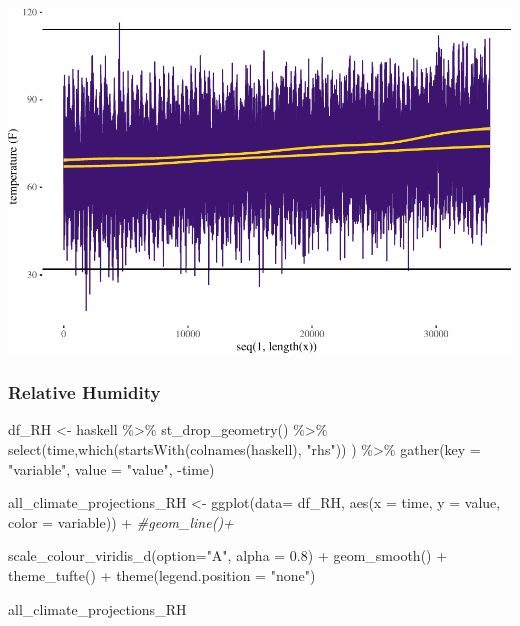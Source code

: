 \documentclass[
  paper=a4,
  ,captions=tableheading
]{scrartcl}
\newenvironment{Shaded}{\begin{snugshade}}{\end{snugshade}}
\newcommand{\AttributeTok}[1]{\textcolor[rgb]{0.77,0.63,0.00}{#1}}
\newcommand{\CommentTok}[1]{\textcolor[rgb]{0.56,0.35,0.01}{\textit{#1}}}
\newcommand{\FloatTok}[1]{\textcolor[rgb]{0.00,0.00,0.81}{#1}}
\newcommand{\FunctionTok}[1]{\textcolor[rgb]{0.00,0.00,0.00}{#1}}
\newcommand{\NormalTok}[1]{#1}
\newcommand{\OtherTok}[1]{\textcolor[rgb]{0.56,0.35,0.01}{#1}}
\newcommand{\SpecialCharTok}[1]{\textcolor[rgb]{0.00,0.00,0.00}{#1}}
\newcommand{\StringTok}[1]{\textcolor[rgb]{0.31,0.60,0.02}{#1}}
\begin{document}
\includegraphics{Haskell_files/figure-latex/unnamed-chunk-73-1.pdf}

\hypertarget{relative-humidity}{%
\subsubsection{Relative Humidity}\label{relative-humidity}}

\begin{Shaded}
\begin{Highlighting}[]
\NormalTok{df\_RH }\OtherTok{\textless{}{-}}\NormalTok{ haskell }\SpecialCharTok{\%\textgreater{}\%}
  \FunctionTok{st\_drop\_geometry}\NormalTok{() }\SpecialCharTok{\%\textgreater{}\%}
  \FunctionTok{select}\NormalTok{(time,}\FunctionTok{which}\NormalTok{(}\FunctionTok{startsWith}\NormalTok{(}\FunctionTok{colnames}\NormalTok{(haskell), }\StringTok{"rhs"}\NormalTok{)) ) }\SpecialCharTok{\%\textgreater{}\%}
  \FunctionTok{gather}\NormalTok{(}\AttributeTok{key =} \StringTok{"variable"}\NormalTok{, }\AttributeTok{value =} \StringTok{"value"}\NormalTok{, }\SpecialCharTok{{-}}\NormalTok{time)}
\end{Highlighting}
\end{Shaded}

\begin{Shaded}
\begin{Highlighting}[]
\NormalTok{all\_climate\_projections\_RH }\OtherTok{\textless{}{-}} \FunctionTok{ggplot}\NormalTok{(}\AttributeTok{data=}\NormalTok{ df\_RH, }\FunctionTok{aes}\NormalTok{(}\AttributeTok{x =}\NormalTok{ time, }\AttributeTok{y =}\NormalTok{ value, }\AttributeTok{color =}\NormalTok{ variable)) }\SpecialCharTok{+} 
  \CommentTok{\#geom\_line()+}
  
  \FunctionTok{scale\_colour\_viridis\_d}\NormalTok{(}\AttributeTok{option=}\StringTok{"A"}\NormalTok{, }\AttributeTok{alpha =} \FloatTok{0.8}\NormalTok{) }\SpecialCharTok{+}
  \FunctionTok{geom\_smooth}\NormalTok{() }\SpecialCharTok{+}
  \FunctionTok{theme\_tufte}\NormalTok{() }\SpecialCharTok{+}
  \FunctionTok{theme}\NormalTok{(}\AttributeTok{legend.position =} \StringTok{"none"}\NormalTok{) }
  

\NormalTok{all\_climate\_projections\_RH}
\end{Highlighting}
\end{Shaded}
\end{document}

